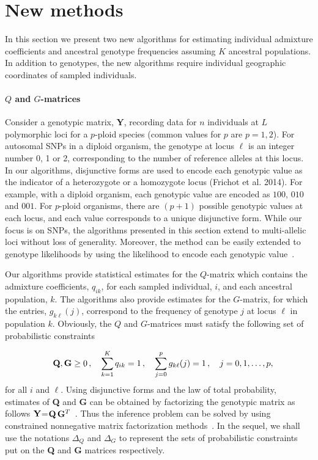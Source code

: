 \clearpage
\newpage

\section{New methods}


In this section we present two new algorithms for estimating individual admixture coefficients and ancestral genotype frequencies assuming $K$ ancestral populations. In addition to genotypes, the new algorithms require individual geographic coordinates of sampled individuals.

\paragraph{$Q$ and $G$-matrices} Consider a genotypic matrix, {\bf Y}, recording data for $n$ individuals at $L$ polymorphic loci for a $p$-ploid species (common values for $p$ are $p = 1,2$). For autosomal SNPs in a diploid organism, the genotype at locus $\ell$  is an integer number 0, 1 or 2, corresponding to the number of reference alleles at this locus. In our algorithms, disjunctive forms are used  to encode each genotypic value as the indicator of a heterozygote or a homozygote locus (Frichot et al. 2014). For example, with a diploid organism, each genotypic value are encoded as $100$, $010$ and $001$. For $p$-ploid organisms, there are $(p+1)$ possible genotypic values at each locus, and each value corresponds to a unique disjunctive form. While our focus is on SNPs, the algorithms presented in this section extend to multi-allelic loci without loss of generality. 
Moreover, the method can be easily extended to genotype likelihoods by using the likelihood to encode each genotypic value~\citep{Korneliussen2014}.

Our algorithms provide statistical estimates for the $Q$-matrix which contains the admixture coefficients, $q_{ik}$, for each sampled individual, $i$, and each ancestral population, $k$. The algorithms also provide estimates for the $G$-matrix, for which the entries, $g_{k\ell}(j)$, correspond to the frequency of genotype $j$ at locus $\ell$ in population $k$. Obviously, the $Q$ and $G$-matrices must satisfy the following set of probabilistic constraints 

$$
\quad {\bf Q},{\bf G} \geq 0 \, , \quad  \sum_{k=1}^K q_{ik} = 1 \, , \quad \sum_{j=0}^p g_{k\ell}(j) = 1 \, , \quad j = 0,1,\dots, p,
$$
for all $i$ and $\ell$. Using disjunctive forms and the law of total probability, estimates of {\bf Q} and {\bf G} can be obtained by factorizing the genotypic matrix as follows ${\bf Y}$=${\bf Q}\,{\bf G}^T$~\citep{Frichot2014}. Thus the inference problem can be solved by using constrained nonnegative matrix factorization methods~\citep{Lee1999, Cichocki2009}. In the sequel, we shall use the notations  $\Delta_Q$ and $\Delta_G$ to represent the sets of probabilistic constraints put on the {\bf Q} and {\bf G} matrices respectively. 


